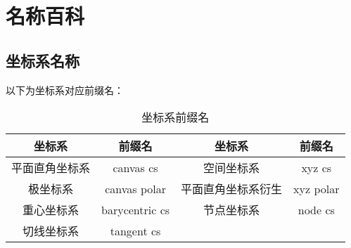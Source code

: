 \newpage
\section{名称百科}
\subsection{坐标系名称}

以下为坐标系对应前缀名：

\begin{table}[H]
    \centering
    \caption{坐标系前缀名}
    \label{table:}
    \setlength{\tabcolsep}{7mm}
    \begin{tabular}{c|cc|c}
        \toprule
        \textbf{坐标系} & \textbf{前缀名} & \textbf{坐标系} & \textbf{前缀名} \\
        \midrule
        平面直角坐标系 & canvas cs & 空间坐标系 & xyz cs \\
        极坐标系 & canvas polar & 平面直角坐标系衍生 & xyz polar \\
        重心坐标系 & barycentric cs & 节点坐标系 & node cs \\
        切线坐标系 & tangent cs &  & \\
        \bottomrule
    \end{tabular}
\end{table}